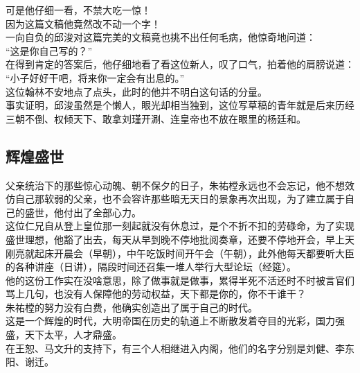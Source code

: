 \begin{multicols}{\theparacolNo}
可是他仔细一看，不禁大吃一惊！\\

因为这篇文稿他竟然改不动一个字！\\

一向自负的邱浚对这篇完美的文稿竟也挑不出任何毛病，他惊奇地问道：\\

“这是你自己写的？”\\

在得到肯定的答案后，他仔细地看了看这位新人，叹了口气，拍着他的肩膀说道：\\

“小子好好干吧，将来你一定会有出息的。”\\

这位翰林不安地点了点头，此时的他并不明白这句话的分量。\\

事实证明，邱浚虽然是个懒人，眼光却相当独到，这位写草稿的青年就是后来历经三朝不倒、权倾天下、敢拿刘瑾开涮、连皇帝也不放在眼里的杨廷和。\\

\subsection{辉煌盛世}
父亲统治下的那些惊心动魄、朝不保夕的日子，朱祐樘永远也不会忘记，他不想效仿自己那软弱的父亲，也不会容许那些暗无天日的景象再次出现，为了建立属于自己的盛世，他付出了全部心力。\\

这位仁兄自从登上皇位那一刻起就没有休息过，是个不折不扣的劳碌命，为了实现盛世理想，他豁了出去，每天从早到晚不停地批阅奏章，还要不停地开会，早上天刚亮就起床开晨会（早朝），中午吃饭时间开午会（午朝），此外他每天都要听大臣的各种讲座（日讲），隔段时间还召集一堆人举行大型论坛（经筵）。\\

他的这份工作实在没啥意思，除了做事就是做事，累得半死不活还时不时被言官们骂上几句，也没有人保障他的劳动权益，天下都是你的，你不干谁干？\\

朱祐樘的努力没有白费，他确实创造出了属于自己的时代。\\

这是一个辉煌的时代，大明帝国在历史的轨道上不断散发着夺目的光彩，国力强盛，天下太平，人才鼎盛。\\

在王恕、马文升的支持下，有三个人相继进入内阁，他们的名字分别是刘健、李东阳、谢迁。\\


\end{multicols}
